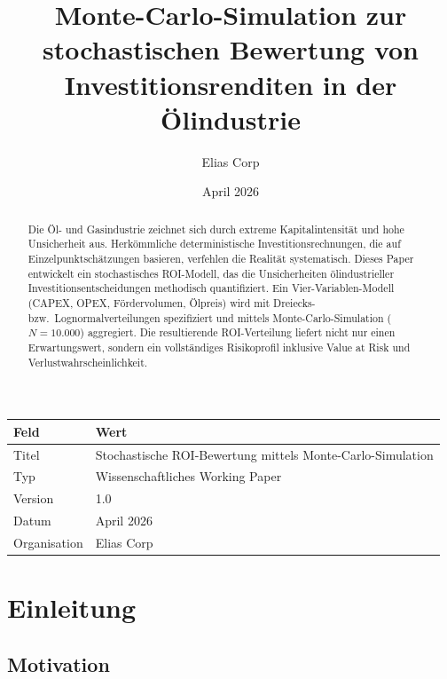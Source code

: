 \documentclass[12pt,a4paper]{article}
\title{\textbf{Monte-Carlo-Simulation zur stochastischen Bewertung von Investitionsrenditen in der Ölindustrie}}
\author{Elias Corp}
\date{April 2026}
\begin{document}
\maketitle

\begin{center}
\begin{tabular}{ll}
\toprule
\textbf{Feld}    & \textbf{Wert} \\
\midrule
Titel       & Stochastische ROI-Bewertung mittels Monte-Carlo-Simulation \\
Typ         & Wissenschaftliches Working Paper \\
Version     & 1.0 \\
Datum       & April 2026 \\
Organisation & Elias Corp \\
\bottomrule
\end{tabular}
\end{center}

\vspace{1cm}

\begin{abstract}
Die Öl- und Gasindustrie zeichnet sich durch extreme Kapitalintensität und hohe Unsicherheit aus. Herkömmliche deterministische Investitionsrechnungen, die auf Einzelpunktschätzungen basieren, verfehlen die Realität systematisch. Dieses Paper entwickelt ein stochastisches ROI-Modell, das die Unsicherheiten ölindustrieller Investitionsentscheidungen methodisch quantifiziert. Ein Vier-Variablen-Modell (CAPEX, OPEX, Fördervolumen, Ölpreis) wird mit Dreiecks- bzw.\ Lognormalverteilungen spezifiziert und mittels Monte-Carlo-Simulation ($N = 10.000$) aggregiert. Die resultierende ROI-Verteilung liefert nicht nur einen Erwartungswert, sondern ein vollständiges Risikoprofil inklusive Value at Risk und Verlustwahrscheinlichkeit.
\end{abstract}

\newpage
\tableofcontents
\newpage

\section{Einleitung}

\subsection{Motivation}
\end{document}
